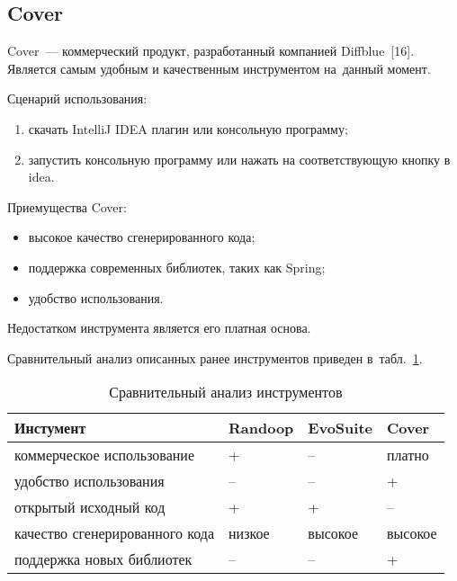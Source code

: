 \clearpage

\subsection{Cover}

Cover~--- коммерческий продукт, разработанный компанией Diffblue~[16]. Является самым удобным и качественным инструментом
на~данный момент.

Сценарий использования: 

\begin{enumerate}
	\item скачать IntelliJ IDEA плагин или консольную программу;
	\item запустить консольную программу или нажать на соответствующую кнопку в idea.
\end{enumerate}

Приемущества Cover: 

\begin{itemize}
	\item высокое качество сгенерированного кода;
	\item поддержка современных библиотек, таких как Spring;
	\item удобство использования.
\end{itemize}

Недостатком инструмента является его платная основа.


Сравнительный анализ описанных ранее инструментов приведен в~табл.~\ref{analys}.
\begin{table} [h!tbp]
	\centering
	\changecaptionwidth\captionwidth{14.75cm}
	\caption{Сравнительный анализ инструментов}\label{analys}%
	\begin{tabular}{| p{7cm} | p{2cm} | p{2cm} | p{2cm} |} \hline
		\textbf{Инстумент}							 	 		  &	\textbf{Randoop}	&	\textbf{EvoSuite}	&	\textbf{Cover}			\\ \hline
		коммерческое использование  					& 	+						   & 		--						& платно						\\ \hline
		удобство использования 					 			 & -- 							& -- 							 & +						      	\\ \hline
		открытый исходный код 					 			  & +							& +							      & --						      	\\ \hline
		качество сгенерированного кода 			    	 & низкое				  & высокое					   & высокое					\\ \hline
		поддержка новых библиотек  	                       & --				            & --					   		   & +						 		\\ \hline
	\end{tabular}
\end{table}	 

























